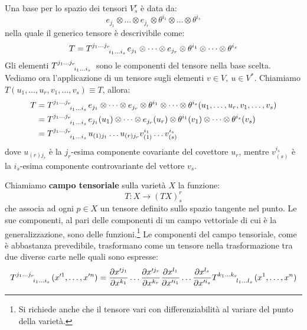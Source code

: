 Una base per lo spazio dei tensori $V^r_s$ è data da:
\begin{equation}
    e_{j_1} \otimes \dots \otimes e_{j_r} \otimes \theta^{i_1} \otimes \dots \otimes \theta^{i_s}
\end{equation}
nella quale il generico tensore è descrivibile come:
\begin{equation}
    T = \tensor{T}{^{j_1 \dots j_r}_{i_1 \dots i_s}} e_{j_1} \otimes \dots \otimes e_{j_r} \otimes \theta^{i_1} \otimes \dots \otimes \theta^{i_s}
\end{equation}
Gli elementi $\tensor{T}{^{j_1 \dots j_r}_{i_1 \dots i_s}}$ sono le componenti del tensore nella base scelta. Vediamo ora l'applicazione di un tensore sugli elementi $v \in V, \ u \in V^*$.
Chiamiamo $T(u_1, \dots, u_r, v_1, \dots, v_s) \equiv T$, allora:
\begin{align*}
    T &= \tensor{T}{^{j_1 \dots j_r}_{i_1 \dots i_s}} e_{j_1} \otimes \dots \otimes e_{j_r} \otimes \theta^{i_1} \otimes \dots \otimes \theta^{i_s} (u_1, \dots, u_r, v_1, \dots, v_s) \\
    &= \tensor{T}{^{j_1 \dots j_r}_{i_1 \dots i_s}} e_{j_1}(u_1) \otimes \dots \otimes e_{j_r}(u_r) \otimes \theta^{i_1}(v_1) \otimes \dots \otimes \theta^{i_s}(v_s)\\
    &= \tensor{T}{^{j_1 \dots j_r}_{i_1 \dots i_s}} u_{(1) j_1} \dots u_{(r)j_r} v_{(1)}^{i_1}\dots v_{(s)}^{i_s}
\end{align*}
dove $u_{(r)j_r}$ è la $j_r$-esima componente covariante del covettore $u_r$, mentre $ v_{(s)}^{i_s}$ è la $i_s$-esima componente controvariante del vettore $v_s$.

\begin{definizione}
Chiamiamo \textbf{campo tensoriale} sulla varietà $X$ la funzione:
\begin{equation*}
    T : X \rightarrow (TX)^r_s
\end{equation*}
che associa ad ogni $p \in X$ un tensore definito sullo spazio tangente nel punto. Le sue componenti, al pari delle componenti di un campo vettoriale di cui è la generalizzazione, sono delle funzioni.\footnote{Si richiede anche che il tensore vari con differenziabilità al variare del punto della varietà.} Le componenti del campo tensoriale, come è abbastanza prevedibile, trasformano come un tensore nella trasformazione tra due diverse carte nelle quali sono espresse:
\begin{equation*}
    \tensor{T}{^{j_1\dots j_r}_{i_1\dots i_s}}(x'^1,\dots, x'^n) = \frac{\partial x'^{j_1}}{\partial x^{k_1}} \dots \frac{\partial x'^{j_r}}{\partial x^{k_r}} \frac{\partial x^{l_1}}{\partial x'^{i_1}} \dots \frac{\partial x^{l_s}}{\partial x'^{i_s}} \tensor{T}{^{k_1 \dots k_r}_{l_1\dots l_s}}(x^1,\dots, x^n)
\end{equation*}
\end{definizione}
